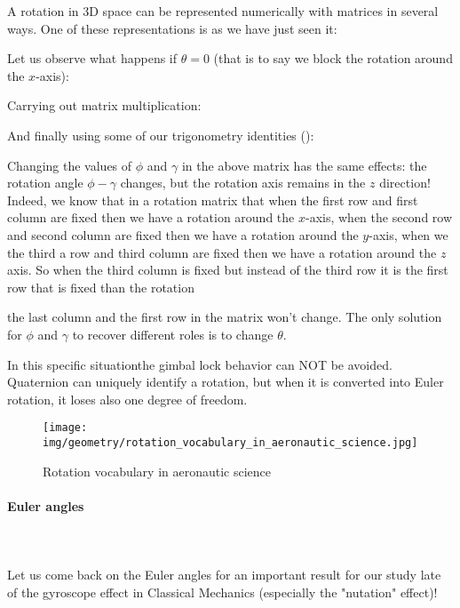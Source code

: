 	A rotation in 3D space can be represented numerically with matrices in several ways. One of these representations is as we have just seen it:
	
	Let us observe what happens if $\theta=0$ (that is to say we block the rotation around the $x$-axis):
	
	Carrying out matrix multiplication:
	
	And finally using some of our trigonometry identities ():
	
	Changing the values of $\phi$ and $\gamma$  in the above matrix has the same effects: the rotation angle $\phi-\gamma$ changes, but the rotation axis remains in the $z$ direction! Indeed, we know that in a rotation matrix that when the first row and first column are fixed then we have a rotation around the $x$-axis, when the second row and second column are fixed then we have a rotation around the $y$-axis, when we the third a row and third column are fixed then we have a rotation around the $z$ axis. So when the third column is fixed but instead of the third row it is the first row that is fixed than the rotation
	
	the last column and the first row in the matrix won't change. The only solution for $\phi$  and $\gamma$  to recover different roles is to change $\theta$.
	
	In this specific situationthe gimbal lock behavior can NOT be avoided. Quaternion can uniquely identify a rotation, but when it is converted into Euler rotation, it loses also one degree of freedom. 
	\begin{figure}[H]
		\centering
		\texttt{[image: img/geometry/rotation\_vocabulary\_in\_aeronautic\_science.jpg]}
		\caption{Rotation vocabulary in aeronautic science}
	\end{figure}
	
	\pagebreak
	\paragraph{Euler angles}\mbox{}\\\\
	Let us come back on the Euler angles for an important result for our study late of the gyroscope effect in Classical Mechanics (especially the "nutation" effect)!
		

